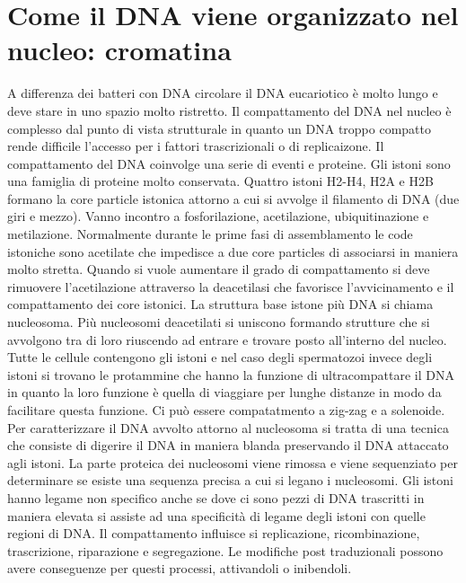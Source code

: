\section{Come il DNA viene organizzato nel nucleo: cromatina}
A differenza dei batteri con DNA circolare il DNA eucariotico \`e molto lungo e deve stare in uno spazio molto ristretto. Il compattamento del DNA nel nucleo \`e complesso dal punto di
vista strutturale in quanto un DNA troppo compatto rende difficile l'accesso per i fattori trascrizionali o di replicaizone. Il compattamento del DNA coinvolge una serie di eventi e 
proteine. Gli istoni sono una famiglia di proteine molto conservata. Quattro istoni H2-H4, H2A e H2B formano la core particle istonica attorno a cui si avvolge il filamento di DNA (due 
giri e mezzo). Vanno incontro a fosforilazione, acetilazione, ubiquitinazione e metilazione. Normalmente durante le prime fasi di assemblamento le code istoniche sono acetilate che 
impedisce a due core particles di associarsi in maniera molto stretta. Quando si vuole aumentare il grado di compattamento si deve rimuovere l'acetilazione attraverso la deacetilasi che
favorisce l'avvicinamento e il compattamento dei core istonici. La struttura base istone pi\`u DNA si chiama nucleosoma. Pi\`u nucleosomi deacetilati si uniscono formando strutture
che si avvolgono tra di loro riuscendo ad entrare e trovare posto all'interno del nucleo. Tutte le cellule contengono gli istoni e nel caso degli spermatozoi invece degli istoni si 
trovano le protammine che hanno la funzione di ultracompattare il DNA in quanto la loro funzione \`e quella di viaggiare per lunghe distanze in modo da facilitare questa funzione. Ci 
pu\`o essere compatatmento a zig-zag e a solenoide. Per caratterizzare il DNA avvolto attorno al nucleosoma si tratta di una tecnica che consiste di digerire il DNA in maniera blanda 
preservando il DNA attaccato agli istoni. La parte proteica dei nucleosomi viene rimossa e viene sequenziato per determinare se esiste una sequenza precisa a cui si legano i nucleosomi.
Gli istoni hanno legame non specifico anche se dove ci sono pezzi di DNA trascritti in maniera elevata si assiste ad una specificit\`a di legame degli istoni con quelle regioni di DNA. 
Il compattamento influisce si replicazione, ricombinazione, trascrizione, riparazione e segregazione. Le modifiche post traduzionali possono avere conseguenze per questi processi, 
attivandoli o inibendoli. 

